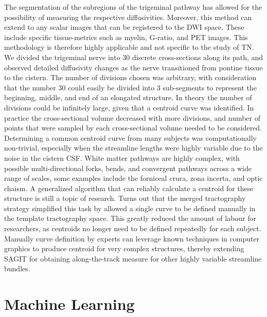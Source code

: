 The segmentation of the subregions of the trigeminal pathway has allowed for the possibility of measuring the respective diffusivities. Moreover, this method can extend to any scalar images that can be registered to the DWI space. These include specific tissue-metrics such as myelin, G-ratio, and PET images. This methodology is therefore highly applicable and not specific to the study of TN. We divided the trigeminal nerve into 30 discrete cross-sections along its path, and observed detailed diffusivity changes as the nerve transitioned from pontine tissue to the cistern. The number of divisions chosen was arbitrary, with consideration that the number 30 could easily be divided into 3 sub-segments to represent the beginning, middle, and end of an elongated structure. In theory the number of divisions could be infinitely large, given that a centroid curve was identified. In practice the cross-sectional volume decreased with more divisions, and number of points that were sampled by each cross-sectional volume needed to be considered. Determining a common centroid curve from many subjects was computationally non-trivial, especially when the streamline lengths were highly variable due to the noise in the cistern CSF. White matter pathways are highly complex, with possible multi-directional forks, bends, and convergent pathways across a wide range of scales, some examples include the forniceal crura, zona incerta, and optic chaism. A generalized algorithm that can reliably calculate a centroid for these structure is still a topic of research. Turns out that the merged tractography strategy simplified this task by allowed a single curve to be defined manually in the template tractography space. This greatly reduced the amount of labour for researchers, as centroids no longer need to be defined repeatedly for each subject. Manually curve definition by experts can leverage known techniques in computer graphics to produce centroid for very complex structures, thereby extending SAGIT for obtaining along-the-track measure for other highly variable streamline bundles.


\section{Machine Learning}

